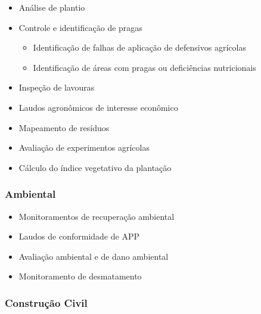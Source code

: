 \begin{itemize}
	\item Análise de plantio
	\item Controle e identificação de pragas
	\begin{itemize}
		\item Identificação de falhas de aplicação de defensivos agrícolas
		\item Identificação de áreas com pragas ou deficiências nutricionais
	\end{itemize}
	\item Inspeção de lavouras
	\item Laudos agronômicos de interesse econômico
	\item Mapeamento de resíduos
	\item Avaliação de experimentos agrícolas
	\item Cálculo do índice vegetativo da plantação
\end{itemize}

\subsubsection*{Ambiental}

\begin{itemize}
	\item Monitoramentos de recuperação ambiental
	\item Laudos de conformidade de APP
	\item Avaliação ambiental e de dano ambiental
	\item Monitoramento de desmatamento
\end{itemize}

\subsubsection*{Construção Civil}


